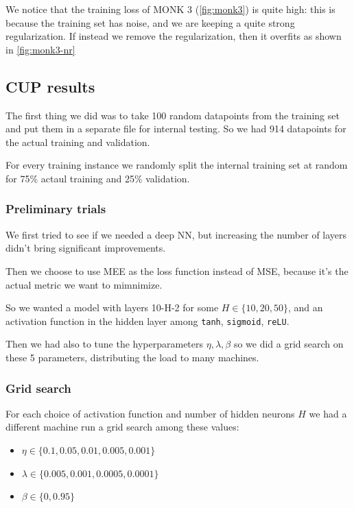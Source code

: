 We notice that the training loss of MONK 3 (\cref{fig:monk3}) is quite high: this is because the training set has noise, and we are keeping a quite strong regularization.
If instead we remove the regularization, then it overfits as shown in \cref{fig:monk3-nr}


\clearpage

\subsection{CUP results}

The first thing we did was to take 100 random datapoints from the training set and put them in a separate file for internal testing. So we had 914 datapoints for the actual training and validation.

For every training instance we randomly split the internal training set at random for 75\% actaul training and 25\% validation.

\subsubsection{Preliminary trials}

We first tried to see if we needed a deep NN, but increasing the number of layers didn't bring significant improvements.

Then we choose to use MEE as the loss function instead of MSE, because it's the actual metric we want to mimnimize.

So we wanted a model with layers 10-H-2 for some $H\in\{ 10, 20, 50 \}$, and an activation function in the hidden layer among \texttt{tanh}, \texttt{sigmoid}, \texttt{reLU}.

Then we had also to tune the hyperparameters $\eta,\lambda,\beta$ so we did a grid search on these 5 parameters, distributing the load to many machines.

\subsubsection{Grid search}

For each choice of activation function and number of hidden neurons $H$ we had a different machine run a grid search among these values:
\begin{itemize}
    \item $\eta\in\{ 0.1, 0.05, 0.01, 0.005, 0.001 \}$
    \item $\lambda\in\{ 0.005, 0.001, 0.0005, 0.0001 \}$
    \item $\beta\in\{ 0, 0.95 \}$
\end{itemize}

